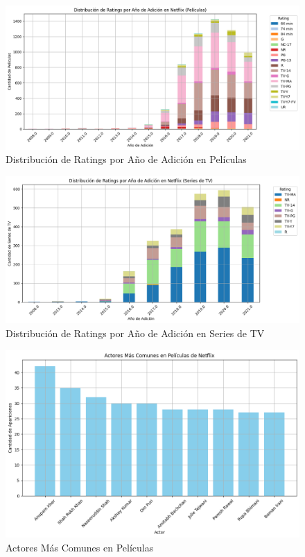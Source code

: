 \documentclass{article}
\begin{document}
\begin{figure}[H]
    \centering
    \includegraphics[width=\textwidth]{Graphs/dist_rating_year_peliculas.png}
    \caption{Distribución de Ratings por Año de Adición en Películas}
    \label{fig:distribucion_ratings_peliculas}
\end{figure}

\begin{figure}[H]
    \centering
    \includegraphics[width=\textwidth]{Graphs/dist_rating_year_series.png}
    \caption{Distribución de Ratings por Año de Adición en Series de TV}
    \label{fig:distribucion_ratings_series}
\end{figure}

\begin{figure}[H]
    \centering
    \includegraphics[width=\textwidth]{Graphs/actores_comunes_peliculas.png}
    \caption{Actores Más Comunes en Películas}
    \label{fig:actores_peliculas}
\end{figure}
\end{document}
